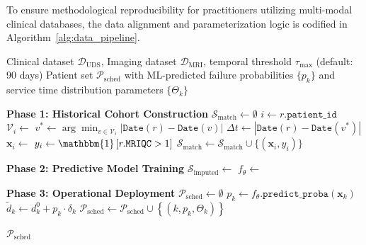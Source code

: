 To ensure methodological reproducibility for practitioners utilizing multi-modal clinical databases, the data alignment and parameterization logic is codified in Algorithm~\ref{alg:data_pipeline}.

\begin{algorithm}[H]
\caption{Asynchronous Data Alignment and Stochastic Parameterization}
\label{alg:data_pipeline}
\begin{algorithmic}[1]
\Require Clinical dataset $\mathcal{D}_{\text{UDS}}$, Imaging dataset $\mathcal{D}_{\text{MRI}}$, temporal threshold $\tau_{\max}$ (default: 90 days)
\Ensure Patient set $\mathcal{P}_{\text{sched}}$ with ML-predicted failure probabilities $\{p_k\}$ and service time distribution parameters $\{\Theta_k\}$

\Statex \textbf{Phase 1: Historical Cohort Construction}
\State $\mathcal{S}_{\text{match}} \gets \emptyset$ 
    \State $i \gets r.\texttt{patient\_id}$
    \State $\mathcal{V}_i \gets$  
    \State $v^* \gets \arg\min_{v \in \mathcal{V}_i} \left| \texttt{Date}(r) - \texttt{Date}(v) \right|$
    \State $\Delta t \gets \left| \texttt{Date}(r) - \texttt{Date}(v^*) \right|$
        \State $\mathbf{x}_i \gets$  
        \State $y_i \gets \mathbbm{1}\left[ r.\texttt{MRIQC} > 1 \right]$ 
        \State $\mathcal{S}_{\text{match}} \gets \mathcal{S}_{\text{match}} \cup \{(\mathbf{x}_i, y_i)\}$
    \EndIf
\EndFor

\Statex \textbf{Phase 2: Predictive Model Training}
\State $\mathcal{S}_{\text{imputed}} \gets$  
\State $f_{\theta} \gets$ 

\Statex \textbf{Phase 3: Operational Deployment}
\State $\mathcal{P}_{\text{sched}} \gets \emptyset$
    \State $p_k \gets f_{\theta}.\texttt{predict\_proba}(\mathbf{x}_k)$ 
    \State $\tilde{d}_k \gets d_k^0 + p_k \cdot \delta_k$ 
    \State $\mathcal{P}_{\text{sched}} \gets \mathcal{P}_{\text{sched}} \cup \left\{ (k, p_k, \Theta_k) \right\}$
\EndFor

\State \Return $\mathcal{P}_{\text{sched}}$
\end{algorithmic}
\end{algorithm}


